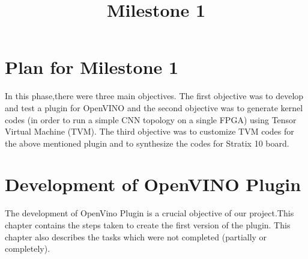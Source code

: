 \documentclass[titlepage]{report}
\title{\textbf{Milestone 1}}
\begin{document}

\tableofcontents{}
\newpage

\chapter{Plan for Milestone 1}
In this phase,there were three main objectives. The first objective was to develop and test a plugin for OpenVINO and the second objective was to generate kernel codes (in order to run a simple CNN topology on a single FPGA) using Tensor Virtual Machine (TVM). 
The third objective was to customize TVM codes for the above mentioned plugin and to synthesize the codes for Stratix 10 board.



\chapter{Development of OpenVINO Plugin}
The development of OpenVino Plugin is a crucial objective of our project.This chapter contains the steps taken to create the first version of the plugin. This chapter also describes the tasks which were not completed (partially or completely). 
\end{document}
